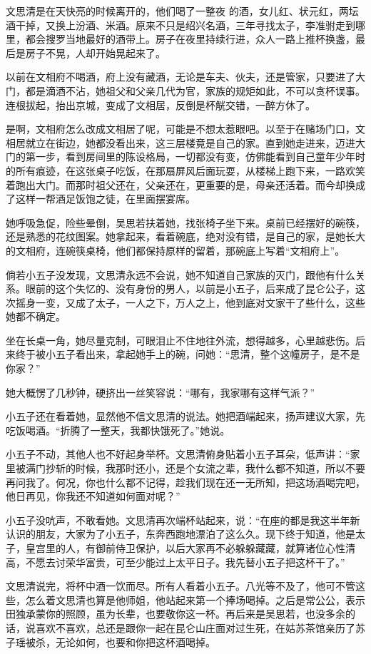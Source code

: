 文思清是在天快亮的时候离开的，他们喝了一整夜
的酒，女儿红、状元红，两坛酒干掉，又换上汾酒、米酒。原来不只是绍兴名酒，三年寻找太子，李准驸走到哪里，都会搜罗当地最好的酒带上。房子在夜里持续行进，众人一路上推杯换盏，最后是房子不晃，人却开始晃起来了。

以前在文相府不喝酒，府上没有藏酒，无论是车夫、伙夫，还是管家，只要进了大门，都是滴酒不沾，她祖父和父亲几代为官，家族的规矩如此，不可以贪杯误事。连根拔起，抬出京城，变成了文相居，反倒是杯觥交错，一醉方休了。

是啊，文相府怎么改成文相居了呢，可能是不想太惹眼吧。以至于在赌场门口，文相居就立在街边，她都没看出来，这三层楼竟是自己的家。直到她走进来，迈进大门的第一步，看到房间里的陈设格局，一切都没有变，仿佛能看到自己童年少年时的所有痕迹，在这张桌子吃饭，在那扇屏风后面玩耍，从楼梯上跑下来，一路欢笑着跑出大门。而那时祖父还在，父亲还在，更重要的是，母亲还活着。而今却换成了这样一帮酒足饭饱之徒，在里面摆宴席。

她呼吸急促，险些晕倒，吴思若扶着她，找张椅子坐下来。桌前已经摆好的碗筷，还是熟悉的花纹图案。她拿起来，看着碗底，绝对没有错，是自己的家，是她长大的文相府，连碗筷桌椅，他们都保持原样的留着，那碗底上写着“文相府上”。

倘若小五子没发现，文思清永远不会说，她不知道自己家族的灭门，跟他有什么关系。眼前的这个失忆的、没有身份的男人，以前是小五子，后来成了昆仑公子，这次摇身一变，又成了太子，一人之下，万人之上，他到底对文家干了些什么，这些她都不确定。

坐在长桌一角，她尽量克制，可眼泪止不住地往外流，想得越多，心里越悲伤。后来终于被小五子看出来，拿起她手上的碗，问她：“思清，整个这幢房子，是不是你家？”

她大概愣了几秒钟，硬挤出一丝笑容说：“哪有，我家哪有这样气派？”

小五子还在看着她，显然他不信文思清的说法。她把酒端起来，扬声建议大家，先吃饭喝酒。“折腾了一整天，我都快饿死了。”她说。

小五子不动，其他人也不好起身举杯。文思清俯身贴着小五子耳朵，低声讲：“家里被满门抄斩的时候，我那时还小，还是个女流之辈，我什么都不知道，所以不要
再问我了。何况，你也什么都不记得，趁我们现在还一无所知，把这场酒喝完吧，他日再见，你我还不知道如何面对呢？”

小五子没吭声，不敢看她。文思清再次端杯站起来，说：“在座的都是我这半年新认识的朋友，大家为了小五子，东奔西跑地漂泊了这么久。现下终于知道，他是太子，皇宫里的人，有御前侍卫保护，以后大家再不必躲躲藏藏，就算诸位心性清高，不愿去讨荣华富贵，可至少能过上太平日子。我先替小五子把这杯干了。”

文思清说完，将杯中酒一饮而尽。所有人看着小五子。八光等不及了，他可不管这些，怎么着文思清也算是他师姐，他站起来第一个捧场喝掉。之后是常公公，表示田独承蒙你的照顾，虽为长辈，也要敬你这一杯。再后来是吴思若，也没多余的话，说喜欢不喜欢，总还是跟你一起在昆仑山庄面对过生死，在姑苏茶馆亲历了苏子瑶被杀，无论如何，也要和你把这杯酒喝掉。

